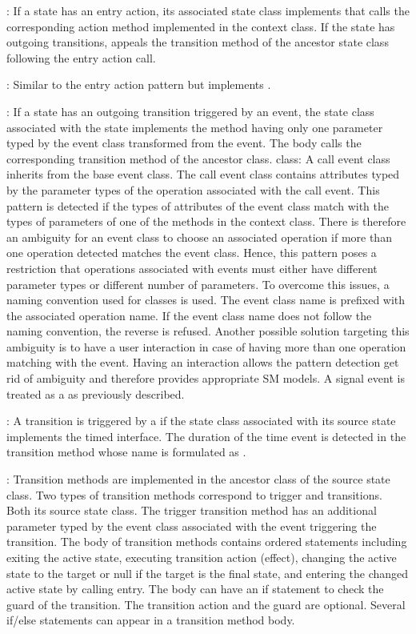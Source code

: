 : If a state has an entry action, its associated state class implements  that calls the corresponding action method implemented in the context class. If the state has outgoing  transitions,  appeals the  transition method of the ancestor state class following the entry action call.

: Similar to the entry action pattern but implements .

: If a state has an outgoing transition triggered by an event, the state class associated with the state implements the  method having only one parameter typed by the event class transformed from the event. The body calls the corresponding transition method of the ancestor class.
 class: A call event class inherits from the base event class. The call event class contains attributes typed by the parameter types of the operation associated with the call event. This pattern is detected if the types of attributes of the event class match with the types of parameters of one of the methods in the context class. There is therefore an ambiguity for an event class to choose an associated operation if more than one operation detected matches the event class. Hence, this pattern poses a restriction that operations associated with events must either have different parameter types or different number of parameters. To overcome this issues, a naming convention used for  classes is used. The event class name is prefixed with the associated operation name. If the event class name does not follow the naming convention, the reverse is refused. Another possible solution targeting this ambiguity is to have a user interaction in case of having more than one operation matching with the event. Having an interaction allows the pattern detection get rid of ambiguity and therefore provides appropriate SM models. A signal event is treated as a  as previously described.

: A transition is triggered by a  if the state class associated with its source state implements the timed interface. The duration of the time event is detected in the transition method whose name is formulated as . 

: Transition methods are implemented in the ancestor class of the source state class. Two types of transition methods correspond to trigger and  transitions. Both  its source state class. The trigger transition method has an additional parameter typed by the event class associated with the event triggering the transition. The body of transition methods contains ordered statements including exiting the active state, executing transition action (effect), changing the active state to the target or null if the target is the final state, and entering the changed active state by calling entry. The body can have an if statement to check the guard of the transition. The transition action and the guard are optional. Several if/else statements can appear in a  transition method body.

